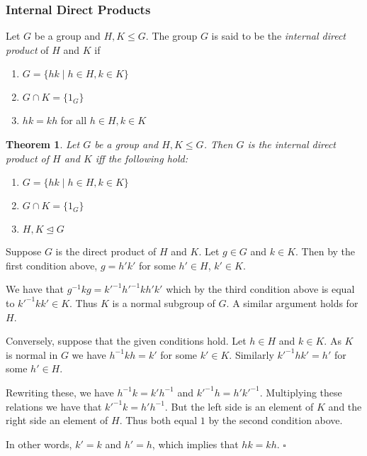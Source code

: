 \documentclass[10pt]{article}
\newtheorem{theorem}{Theorem}[section]
\newenvironment{proof}[1][Proof]{\begin{trivlist}
\item[\hskip \labelsep {\itshape #1}]}{\end{trivlist}}
\newenvironment{definition}[1][Definition]{\begin{trivlist}
\item[\hskip \labelsep {\bfseries #1}]}{\end{trivlist}}
\begin{document}
\subsubsection{Internal Direct Products}

\begin{definition}
Let $G$ be a group and $H, K \leq G$. The group $G$ is said to be the \emph{internal direct product} of $H$ and $K$ if
\begin{enumerate}
\item $G = \{hk \;|\; h \in H, k \in K\}$
\item $G\cap K = \{1_G\}$
\item $hk = kh$ for all $h \in H, k \in K$
\end{enumerate}
\end{definition}

\begin{theorem}
Let $G$ be a group and $H, K \leq G$. Then $G$ is the internal direct product of $H$ and $K$ iff the following hold:
\begin{enumerate}
\item $G = \{hk \;|\; h \in H, k \in K\}$
\item $G\cap K = \{1_G\}$
\item $H, K \mathrel{\unlhd} G$
\end{enumerate}
\end{theorem}

\begin{proof}
Suppose $G$ is the direct product of $H$ and $K$. Let $g \in G$ and $k \in K$. Then by the first condition above, $g = h'k'$ for some $h' \in H$, $k' \in K$.

We have that $g^{-1}kg = k'^{-1}h'^{-1}kh'k'$ which by the third condition above is equal to $k'^{-1}kk' \in K$. Thus $K$ is a normal subgroup of $G$. A similar argument holds for $H$.

Conversely, suppose that the given conditions hold. Let $h \in H$ and $k \in K$. As $K$ is normal in $G$ we have $h^{-1}kh = k'$ for some $k' \in K$. Similarly $k'^{-1}hk' = h'$ for some $h' \in H$.

Rewriting these, we have $h^{-1}k = k'h^{-1}$ and $k'^{-1}h = h'k'^{-1}$. Multiplying these relations we have that $k'^{-1}k = h'h^{-1}$. But the left side is an element of $K$ and the right side an element of $H$. Thus both equal $1$ by the second condition above.

In other words, $k' = k$ and $h' = h$, which implies that $hk = kh$. $\square$
\end{proof}
\end{document}
